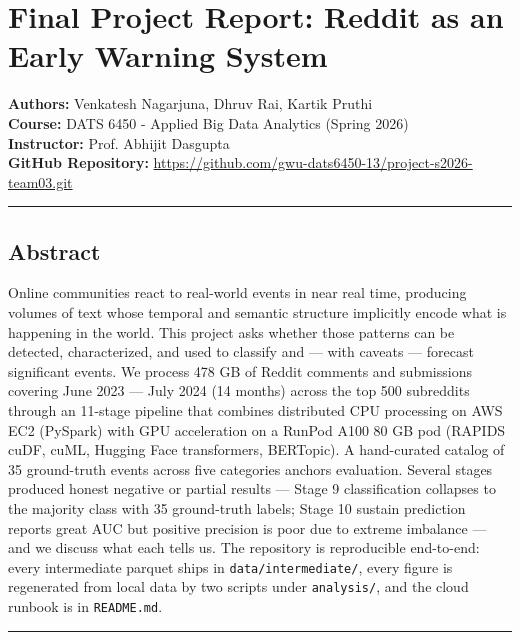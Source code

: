 \documentclass[
]{article}
\author{Venkatesh}
\date{May 1, 2026}
\begin{document}
\section{Final Project Report: Reddit as an Early Warning System}\label{early-warning-system}

\textbf{Authors:} Venkatesh Nagarjuna, Dhruv Rai, Kartik Pruthi\\
\textbf{Course:} DATS 6450 - Applied Big Data Analytics (Spring 2026)\\
\textbf{Instructor:} Prof. Abhijit Dasgupta\\
\textbf{GitHub Repository:}
\url{https://github.com/gwu-dats6450-13/project-s2026-team03.git}

\begin{center}\rule{0.5\linewidth}{0.5pt}\end{center}

\subsection{Abstract}\label{abstract}

Online communities react to real-world events in near real time,
producing volumes of text whose temporal and semantic structure
implicitly encode what is happening in the world. This project asks
whether those patterns can be detected, characterized, and used to
classify and --- with caveats --- forecast significant events. We
process 478 GB of Reddit comments and submissions covering June 2023 ---
July 2024 (14 months) across the top 500 subreddits through an 11-stage
pipeline that combines distributed CPU processing on AWS EC2 (PySpark)
with GPU acceleration on a RunPod A100 80 GB pod (RAPIDS cuDF, cuML,
Hugging Face transformers, BERTopic). A hand-curated catalog of 35
ground-truth events across five categories anchors evaluation. Several
stages produced honest negative or partial results --- Stage 9
classification collapses to the majority class with 35 ground-truth
labels; Stage 10 sustain prediction reports great AUC but positive
precision is poor due to extreme imbalance --- and we discuss what each
tells us. The repository is reproducible end-to-end: every intermediate
parquet ships in \texttt{data/intermediate/}, every figure is
regenerated from local data by two scripts under \texttt{analysis/}, and
the cloud runbook is in \texttt{README.md}.

\begin{center}\rule{0.5\linewidth}{0.5pt}\end{center}
\end{document}
